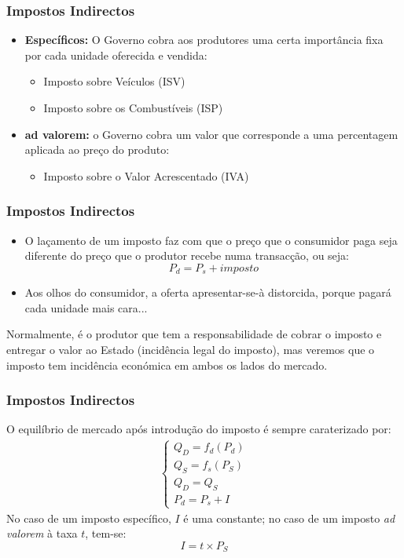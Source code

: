 \begin{frame}
	\frametitle{Impostos Indirectos}
	\begin{itemize}
		\setlength{\itemsep}{0.2cm}
		\item \textbf{Espec\'ificos:} O Governo cobra aos produtores uma certa import\^ancia fixa por cada unidade oferecida e vendida:
		\begin{itemize}
			\item Imposto sobre Ve\'iculos (ISV)
			\item Imposto sobre os Combust\'iveis (ISP)
		\end{itemize}
		\item \textbf{ad valorem:} o Governo cobra um valor que corresponde a uma percentagem aplicada ao pre\c co do produto:
		\begin{itemize}
			\item Imposto sobre o Valor Acrescentado (IVA)
		\end{itemize}
	\end{itemize}

\end{frame}

\begin{frame}
	\frametitle{Impostos Indirectos}
	\begin{itemize}
		\item O la\c camento de um imposto faz com que o pre\c co que o consumidor paga seja diferente do pre\c co que o produtor recebe numa transac\c c\~ao, ou seja: \[P_d=P_s+imposto\]
		\item Aos olhos do consumidor, a oferta apresentar-se-\`a distorcida, porque pagar\'a cada unidade mais cara...
	\end{itemize}
	\begin{center}
		Normalmente, \'e o produtor que tem a responsabilidade de cobrar o imposto e entregar o valor ao Estado (incid\^encia legal do imposto), mas veremos que o imposto tem incid\^encia econ\'omica em ambos os lados do mercado.
	\end{center}
\end{frame}

\begin{frame}
	\frametitle{Impostos Indirectos}
	O equil\'ibrio de mercado ap\'os introdu\c c\~ao do imposto \'e sempre caraterizado por:
	\begin{align*}	
		\left\{
		\begin{array}{c}
			Q_D=f_d(P_d)\\
			Q_S=f_s(P_S)\\
			Q_D=Q_S
			\\P_d=P_s+I
		\end{array}\right.
	\end{align*}
	No caso de um imposto espec\'ifico, $I$ \'e uma constante; no caso de um imposto \emph{ad valorem} \`a taxa $t$, tem-se: \[I=t\times P_S\]
\end{frame}

